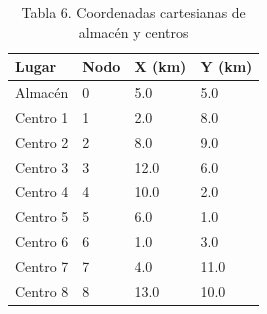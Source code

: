\begin{table}[htbp]
  \centering
  \caption{Tabla 6. Coordenadas cartesianas de almacén y centros}
  \label{tab:tabla-6-coordenadas}
  \begin{tabular}{llll}
    \toprule
    Lugar & Nodo & X (km) & Y (km) \\
    \midrule
    Almacén & 0 & 5.0 & 5.0 \\
    Centro 1 & 1 & 2.0 & 8.0 \\
    Centro 2 & 2 & 8.0 & 9.0 \\
    Centro 3 & 3 & 12.0 & 6.0 \\
    Centro 4 & 4 & 10.0 & 2.0 \\
    Centro 5 & 5 & 6.0 & 1.0 \\
    Centro 6 & 6 & 1.0 & 3.0 \\
    Centro 7 & 7 & 4.0 & 11.0 \\
    Centro 8 & 8 & 13.0 & 10.0 \\
    \bottomrule
  \end{tabular}
\end{table}
